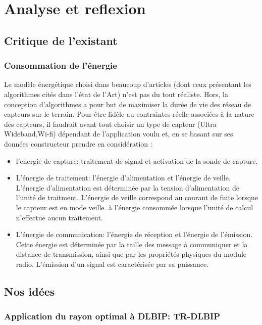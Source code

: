 
\chapter{Analyse et reflexion}\label{Analyse_et_reflexion}


\section{Critique de l'existant}
\subsection{Consommation de l'énergie}
	
Le modèle énergétique choisi dans beaucoup d'articles (dont ceux présentant les algorithmes cités dans l'état de l'Art) n'est pas du tout réaliste.
Hors, la conception d'algorithmes a pour but de maximiser la durée de vie des réseau de capteurs sur le terrain. Pour être fidèle au contraintes 
réelle associées à la nature des capteurs, il faudrait avant tout choisir un type de capteur (Ultra Wideband,Wi-fi) dépendant de l'application voulu et, en se basant sur ses données constructeur prendre en considération :
\begin{itemize}
\item l'energie de capture: traitement de signal et activation de la sonde de capture.
\item L’énergie de traitement: l’énergie d'alimentation et l’énergie de veille. L’énergie d'alimentation est déterminée par la tension d’alimentation de l'unité de traitment. L'énergie de veille correspond au courant de fuite lorsque le capteur est en mode veille.
à l’énergie consommée lorsque l’unité de calcul n’effectue aucun traitement.
\item L’énergie de communication: l’énergie de réception et l’énergie de l’émission. Cette énergie est déterminée par la taille des message à
communiquer et la distance de transmission, ainsi que par les propriétés physiques du module
radio. L’émission d’un signal est caractérisée par sa puissance. 
\end{itemize}

\section{Nos idées}

\subsection{Application du rayon optimal à DLBIP: TR-DLBIP}

